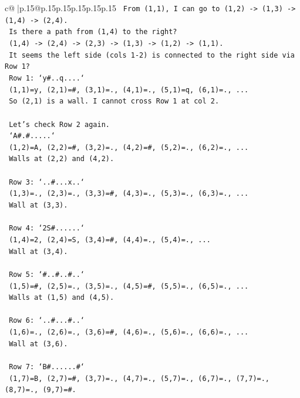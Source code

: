 \documentclass{article}
\begin{document}
{\begin{supertabular}{c@{$\;$}|p{.15\linewidth}@{}p{.15\linewidth}p{.15\linewidth}p{.15\linewidth}p{.15\linewidth}p{.15\linewidth}}
{{{\texttt{   From (1,1), I can go to (1,2) {-}> (1,3) {-}> (1,4) {-}> (2,4).} \\
\texttt{   Is there a path from (1,4) to the right?} \\
\texttt{   (1,4) {-}> (2,4) {-}> (2,3) {-}> (1,3) {-}> (1,2) {-}> (1,1).} \\
\texttt{   It seems the left side (cols 1{-}2) is connected to the right side via Row 1?} \\
\texttt{   Row 1: `y\#..q....`} \\
\texttt{   (1,1)=y, (2,1)=\#, (3,1)=., (4,1)=., (5,1)=q, (6,1)=., ...} \\
\texttt{   So (2,1) is a wall. I cannot cross Row 1 at col 2.} \\
\\ 
\texttt{   Let's check Row 2 again.} \\
\texttt{   `A\#.\#.....`} \\
\texttt{   (1,2)=A, (2,2)=\#, (3,2)=., (4,2)=\#, (5,2)=., (6,2)=., ...} \\
\texttt{   Walls at (2,2) and (4,2).} \\
\\ 
\texttt{   Row 3: `..\#...x..`} \\
\texttt{   (1,3)=., (2,3)=., (3,3)=\#, (4,3)=., (5,3)=., (6,3)=., ...} \\
\texttt{   Wall at (3,3).} \\
\\ 
\texttt{   Row 4: `2S\#......`} \\
\texttt{   (1,4)=2, (2,4)=S, (3,4)=\#, (4,4)=., (5,4)=., ...} \\
\texttt{   Wall at (3,4).} \\
\\ 
\texttt{   Row 5: `\#..\#..\#..`} \\
\texttt{   (1,5)=\#, (2,5)=., (3,5)=., (4,5)=\#, (5,5)=., (6,5)=., ...} \\
\texttt{   Walls at (1,5) and (4,5).} \\
\\ 
\texttt{   Row 6: `..\#...\#..`} \\
\texttt{   (1,6)=., (2,6)=., (3,6)=\#, (4,6)=., (5,6)=., (6,6)=., ...} \\
\texttt{   Wall at (3,6).} \\
\\ 
\texttt{   Row 7: `B\#......\#`} \\
\texttt{   (1,7)=B, (2,7)=\#, (3,7)=., (4,7)=., (5,7)=., (6,7)=., (7,7)=., (8,7)=., (9,7)=\#.} \\
}}}
\end{supertabular}}
\end{document}
